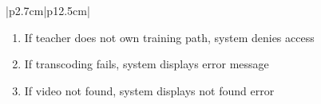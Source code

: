 \begin{table}[H]
\begin{tabular}{|p{2.7cm}|p{12.5cm}|}
\begin{minipage}[t]{\linewidth}
\begin{enumerate}[topsep=0pt,itemsep=1pt,parsep=0pt,partopsep=0pt]
                                          \item If teacher does not own training path, system denies access
                                          \item If transcoding fails, system displays error message
                                          \item If video not found, system displays not found error
                                      \end{enumerate}
                                  \end{minipage} \\
        \hline
    \end{tabular}
    \label{tab:teacher-video-status}
\end{table}
